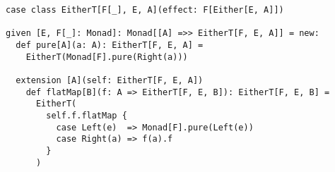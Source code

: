 \begin{algorithm}

\begin{verbatim}
case class EitherT[F[_], E, A](effect: F[Either[E, A]])

given [E, F[_]: Monad]: Monad[[A] =>> EitherT[F, E, A]] = new:
  def pure[A](a: A): EitherT[F, E, A] =
    EitherT(Monad[F].pure(Right(a)))

  extension [A](self: EitherT[F, E, A])
    def flatMap[B](f: A => EitherT[F, E, B]): EitherT[F, E, B] =
      EitherT(
        self.f.flatMap {
          case Left(e)  => Monad[F].pure(Left(e))
          case Right(a) => f(a).f
        }
      )
\end{verbatim}

\caption{EitherT monad transformer in Scala %
\label{monadtransformer:either-t}}
\end{algorithm}
